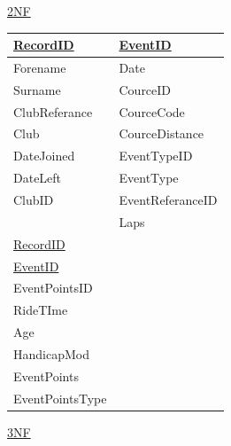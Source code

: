 \underline{2NF}

\begin{tabular}{|l|l|}
\hline
\underline{RecordID}  & \underline{EventID} \\ \hline
Forename             & Date                \\ \hline
Surname              & CourceID            \\ \hline
ClubReferance        & CourceCode          \\ \hline
Club                 & CourceDistance      \\ \hline
DateJoined           & EventTypeID         \\ \hline
DateLeft             & EventType           \\ \hline
ClubID               & EventReferanceID    \\ \hline
                     & Laps                \\ \hline
\underline{RecordID} &                     \\ \hline
\underline{EventID}  &                     \\ \hline 
EventPointsID        &                     \\ \hline
RideTIme             &                     \\ \hline
Age                  &                     \\ \hline
HandicapMod          &                     \\ \hline
EventPoints          &                     \\ \hline
EventPointsType      &                     \\ \hline
\end{tabular}

\underline{3NF}

